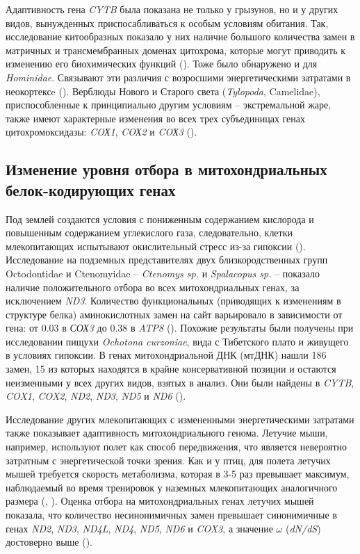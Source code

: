 Адаптивность гена \textit{CYTB} была показана не только у грызунов, но и у других видов, вынужденных приспосабливаться к особым условиям обитания. Так, исследование китообразных показало у них наличие большого количества замен в матричных и трансмембранных доменах цитохрома, которые могут приводить к изменению его биохимических функций (\cite{McClellan2005}). Тоже было обнаружено и для \textit{Hominidae}. Связывают эти различия с возросшими энергетическими затратами в неокортексe (\cite{Adkins1994}). Верблюды Нового и Старого света (\textit{Tylopoda}, Camelidae), приспособленные к принципиально другим условиям -- экстремальной жаре, также имеют характерные изменения во всех трех субъединицах генах цитохромоксидазы: \textit{COХ1}, \textit{COХ2} и \textit{COХ3} (\cite{DiRocco2006}). 

\subsection{Изменение уровня отбора в митохондриальных белок-кодирующих генах}

Под землей создаются условия с пониженным содержанием кислорода и повышенным содержанием углекислого газа, следовательно, клетки млекопитающих испытывают окислительный стресс из-за гипоксии (\cite{Dirmeier2002}). Исследование на подземных представителях двух близкородственных групп Octodontidae и Ctenomyidae -- \textit{Ctenomys sp.} и \textit{Spalacopus sp.} -- показало наличие положительного отбора во всех митохондриальных генах, за исключением \textit{ND3}. Количество функциональных (приводящих к изменениям в структуре белка) аминокислотных замен на сайт варьировало в зависимости от гена: от 0.03 в \textit{СОХ3} до 0.38 в \textit{ATP8} (\cite{Tomasco2011}). Похожие результаты были получены при исследовании пищухи \textit{Ochotona curzoniae}, вида с Тибетского плато и живущего в условиях гипоксии. В генах митохондриальной ДНК (мтДНК) нашли 186 замен, 15 из которых находятся в крайне консервативной позиции и остаются неизменными у всех других видов, взятых в анализ. Они были найдены в  \textit{CYTB}, \textit{COX1}, \textit{COX2}, \textit{ND2}, \textit{ND3}, \textit{ND5} и \textit{ND6} (\cite{Luo2008}). 

Исследование других млекопитающих с измененными энергетическими затратами также показывает адаптивность митохондриального генома. Летучие мыши, например, используют полет как способ передвижения, что является невероятно затратным с энергетической точки зрения. Как и у птиц, для полета летучих мышей требуется скорость метаболизма, которая в 3-5 раз превышает максимум, наблюдаемый во время тренировок у наземных млекопитающих аналогичного размера (\cite{THOMASSTEVENP.SUTHERS1972}, \cite{Maina2000}).  Оценка отбора на митохондриальных генах летучих мышей показала, что количество несинонимичных замен превышает синонимичные в генах  \textit{ND2}, \textit{ND3}, \textit{ND4L}, \textit{ND4}, \textit{ND5}, \textit{ND6} и \textit{COX3}, а значение $\omega$ (\textit{dN/dS}) достоверно выше (\cite{Shen2010}). 

